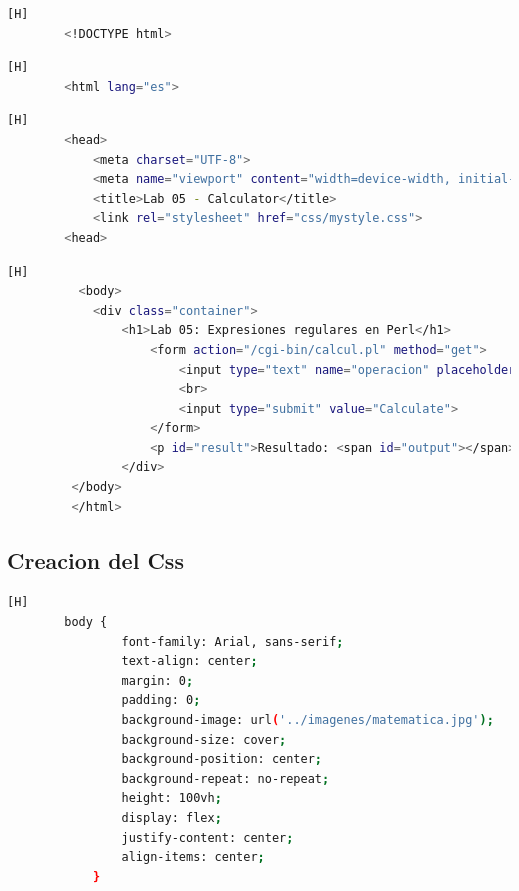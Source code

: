 \documentclass{article}
\begin{document}
		
	\begin{lstlisting}[language=bash,caption={Aviso que le dice al navegador que este documento es una página web en HTML5.}][H]
		<!DOCTYPE html>
	\end{lstlisting}
	\begin{lstlisting}[language=bash,caption={Etiqueta que envuelve todo el contenido de la página; indica al navegador que el idioma es español.}][H]
		<html lang="es">
	\end{lstlisting}	
	\begin{lstlisting}[language=bash,caption={Esta sección configura las bases para el funcionamiento y la presentación de la página web, asegurando que sea accesible y visualmente atractiva en diferentes dispositivos.}][H]
        <head>
            <meta charset="UTF-8">
            <meta name="viewport" content="width=device-width, initial-scale=1.0">
            <title>Lab 05 - Calculator</title>
            <link rel="stylesheet" href="css/mystyle.css">
        <head>

	\end{lstlisting}
	\begin{lstlisting}[language=bash,caption={Esta sección define el contenido visible de la página, permitiendo a los usuarios ingresar una operación matemática, enviar el formulario y ver el resultado. Está diseñada para ser facil de usar.}][H]
	      <body>
            <div class="container">
                <h1>Lab 05: Expresiones regulares en Perl</h1>
                    <form action="/cgi-bin/calcul.pl" method="get">
                        <input type="text" name="operacion" placeholder="operacion" required>
                        <br>
                        <input type="submit" value="Calculate">
                    </form>
                    <p id="result">Resultado: <span id="output"></span></p>
                </div>
         </body>
         </html>
	\end{lstlisting}
	
	\subsection{Creacion del Css} 
        \begin{lstlisting}[language=bash,caption={Esta parte del código ayuda a crear un diseño limpio y centrado en la página.}][H]
		body {
                font-family: Arial, sans-serif;
                text-align: center;
                margin: 0;
                padding: 0;
                background-image: url('../imagenes/matematica.jpg');
                background-size: cover;
                background-position: center;
                background-repeat: no-repeat;
                height: 100vh;
                display: flex;
                justify-content: center;
                align-items: center;
            }
	\end{lstlisting}
	
\end{document}
